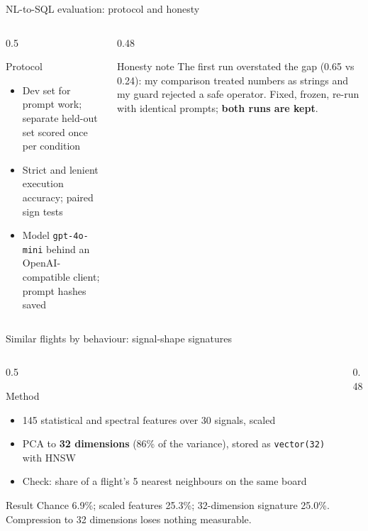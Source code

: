 \documentclass[aspectratio=169,10pt]{beamer}
\newcommand{\code}[1]{\texttt{\footnotesize #1}}
\newcommand{\listing}[1]{}
\begin{document}
\begin{frame}[shrink=5]{NL-to-SQL evaluation: protocol and honesty}
\begin{columns}[T]
\begin{column}{0.5\textwidth}
\begin{block}{Protocol}
\begin{itemize}
  \item Dev set for prompt work; separate held-out set scored once per condition
  \item Strict and lenient execution accuracy; paired sign tests
  \item Model \code{gpt-4o-mini} behind an OpenAI-compatible client; prompt hashes saved
\end{itemize}
\end{block}
\end{column}
\begin{column}{0.48\textwidth}
\begin{block}{Honesty note}
The first run overstated the gap (0.65 vs 0.24): my comparison treated numbers as strings and my guard rejected a safe operator. Fixed, frozen, re-run with identical prompts; \textbf{both runs are kept}.
\end{block}
\end{column}
\end{columns}
\vspace{0.3em}
\listing{code-gold}
\end{frame}

\begin{frame}[shrink=5]{Similar flights by behaviour: signal-shape signatures}
\begin{columns}[T]
\begin{column}{0.5\textwidth}
\begin{block}{Method}
\begin{itemize}
  \item 145 statistical and spectral features over 30 signals, scaled
  \item PCA to \textbf{32 dimensions} (86\% of the variance), stored as \code{vector(32)} with HNSW
  \item Check: share of a flight's 5 nearest neighbours on the same board
\end{itemize}
\end{block}
\begin{block}{Result}
Chance 6.9\%; scaled features 25.3\%; 32-dimension signature 25.0\%. Compression to 32 dimensions loses nothing measurable.
\end{block}
\end{column}
\begin{column}{0.48\textwidth}
\listing{code-pca}
\end{column}
\end{columns}
\end{frame}
\end{document}
